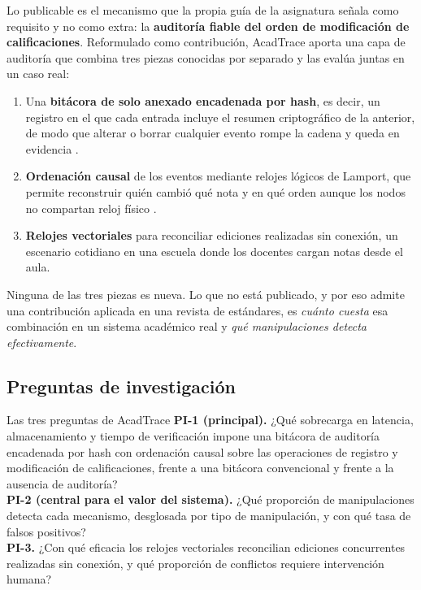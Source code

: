 \documentclass[11pt,a4paper]{article}
\begin{document}
Lo publicable es el mecanismo que la propia guía de la asignatura señala como requisito y no como extra: la \textbf{auditoría fiable del orden de modificación de calificaciones}. Reformulado como contribución, AcadTrace aporta una capa de auditoría que combina tres piezas conocidas por separado y las evalúa juntas en un caso real:

\begin{enumerate}[leftmargin=*,itemsep=3pt]
	\item Una \textbf{bitácora de solo anexado encadenada por hash}, es decir, un registro en el que cada entrada incluye el resumen criptográfico de la anterior, de modo que alterar o borrar cualquier evento rompe la cadena y queda en evidencia \cite{haber1991timestamp}.
	\item \textbf{Ordenación causal} de los eventos mediante relojes lógicos de Lamport, que permite reconstruir quién cambió qué nota y en qué orden aunque los nodos no compartan reloj físico \cite{lamport1978time}.
	\item \textbf{Relojes vectoriales} para reconciliar ediciones realizadas sin conexión, un escenario cotidiano en una escuela donde los docentes cargan notas desde el aula.
\end{enumerate}

Ninguna de las tres piezas es nueva. Lo que no está publicado, y por eso admite una contribución aplicada en una revista de estándares, es \emph{cuánto cuesta} esa combinación en un sistema académico real y \emph{qué manipulaciones detecta efectivamente}.

\subsection{Preguntas de investigación}

\begin{aviso}{Las tres preguntas de AcadTrace}
	\textbf{PI-1 (principal).} ¿Qué sobrecarga en latencia, almacenamiento y tiempo de verificación impone una bitácora de auditoría encadenada por hash con ordenación causal sobre las operaciones de registro y modificación de calificaciones, frente a una bitácora convencional y frente a la ausencia de auditoría?\\[6pt]
	\textbf{PI-2 (central para el valor del sistema).} ¿Qué proporción de manipulaciones detecta cada mecanismo, desglosada por tipo de manipulación, y con qué tasa de falsos positivos?\\[6pt]
	\textbf{PI-3.} ¿Con qué eficacia los relojes vectoriales reconcilian ediciones concurrentes realizadas sin conexión, y qué proporción de conflictos requiere intervención humana?
\end{aviso}
\end{document}
